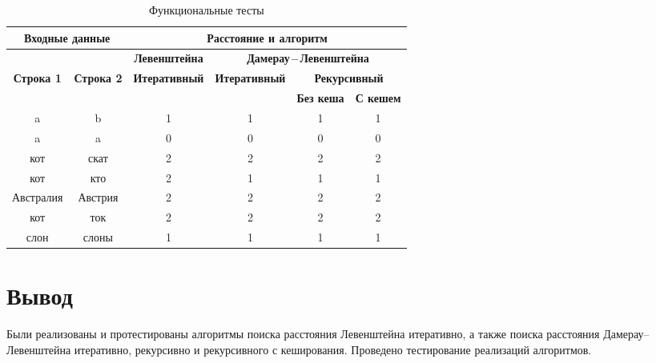 \begin{table}[ht]
	\small
	\begin{center}
		\begin{threeparttable}
		\caption{Функциональные тесты}
		\label{tbl:func_tests}
		\begin{tabular}{|c|c|c|c|c|c|}
			\hline
			\multicolumn{2}{|c|}{\bfseries Входные данные}
			& \multicolumn{4}{c|}{\bfseries Расстояние и алгоритм} \\ 
			\hline 
			&
			& \multicolumn{1}{c|}{\bfseries Левенштейна} 
			& \multicolumn{3}{c|}{\bfseries Дамерау\,--\,Левенштейна} \\ \cline{3-6}
			
			\bfseries Строка 1 & \bfseries Строка 2 & \bfseries Итеративный & \bfseries Итеративный
			
			& \multicolumn{2}{c|}{\bfseries Рекурсивный} \\ \cline{5-6}
			& & & & \bfseries Без кеша & \bfseries С кешем \\
			\hline
			a & b & 1 & 1 & 1 & 1 \\
			\hline
			a & a & 0 & 0 & 0 & 0 \\
			\hline
			кот & скат & 2 & 2 & 2 & 2 \\
			\hline
			кот & кто & 2 & 1 & 1 & 1 \\
			\hline
			Австралия & Австрия & 2 & 2 & 2 & 2 \\
			\hline
			кот & ток & 2 & 2 & 2 & 2 \\
			\hline
			слон & слоны & 1 & 1 & 1 & 1 \\
			\hline
		\end{tabular}	
		\end{threeparttable}
	\end{center}
\end{table}

\section*{Вывод}
Были реализованы и протестированы алгоритмы поиска расстояния Левенштейна итеративно, а также поиска расстояния Дамерау–Левенштейна итеративно, рекурсивно и рекурсивного с кеширования. Проведено тестирование реализаций алгоритмов.
